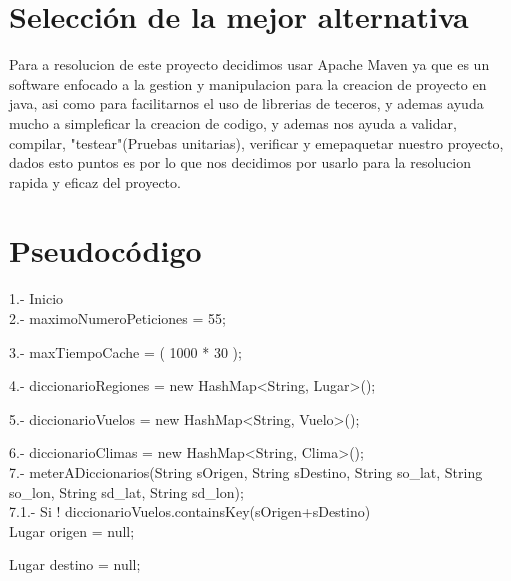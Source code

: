 \documentclass[30pt]{article}
\theoremstyle{definition}
\begin{document}
\section{Selección de la mejor alternativa}

{\large Para a resolucion de este proyecto decidimos usar Apache Maven ya que es un software enfocado a la gestion y manipulacion para la creacion de proyecto en java, asi como para facilitarnos el uso de librerias de teceros, y ademas ayuda mucho a simpleficar la creacion de codigo, y ademas nos ayuda a validar, compilar, "testear"(Pruebas unitarias), verificar y emepaquetar nuestro proyecto, dados esto puntos es por lo que nos decidimos por usarlo para la resolucion rapida y eficaz del proyecto.}\\

\newpage
\section{Pseudocódigo}

1.- Inicio\\

    \hspace{1cm} 2.- maximoNumeroPeticiones = 55;
    
    \hspace{1cm} 3.- maxTiempoCache = ( 1000 * 30 );
    
    \hspace{1cm} 4.- diccionarioRegiones = new HashMap<String, Lugar>();
    
    \hspace{1cm} 5.- diccionarioVuelos = new HashMap<String, Vuelo>();
    
    \hspace{1cm} 6.- diccionarioClimas = new HashMap<String, Clima>();\\
    
\hspace{1cm} 7.-  meterADiccionarios(String sOrigen, String sDestino, String so\_lat, String so\_lon, String sd\_lat, String sd\_lon);\\

    \hspace{2cm} 7.1.- Si ! diccionarioVuelos.containsKey(sOrigen+sDestino)\\
    
    \hspace{3cm} Lugar origen = null;
    
    \hspace{3cm} Lugar destino = null;\\
    
\end{document}
